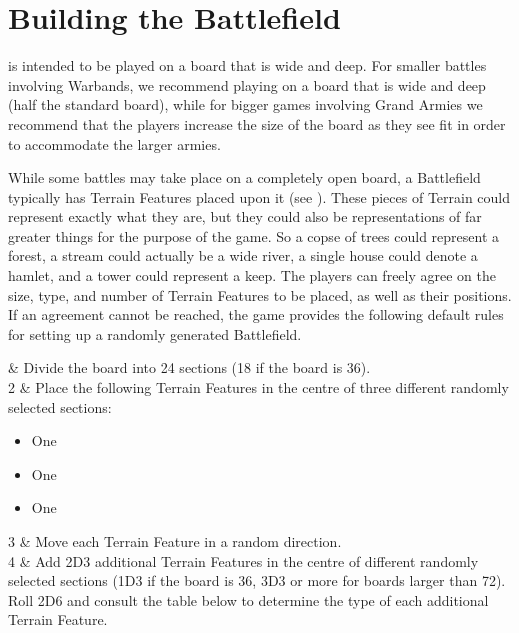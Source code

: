 \newpage
\section{Building the Battlefield}
\label{building_the_battlefield}

\nameofthegame{} is intended to be played on a board that is  wide and  deep. For smaller battles involving Warbands, we recommend playing on a board that is  wide and  deep (half the standard board), while for bigger games involving Grand Armies we recommend that the players increase the size of the board as they see fit in order to accommodate the larger armies.

While some battles may take place on a completely open board, a Battlefield typically has Terrain Features placed upon it (see ). These pieces of Terrain could represent exactly what they are, but they could also be representations of far greater things for the purpose of the game. So a copse of trees could represent a forest, a stream could actually be a wide river, a single house could denote a hamlet, and a tower could represent a keep. The players can freely agree on the size, type, and number of Terrain Features to be placed, as well as their positions. If an agreement cannot be reached, the game provides the following default rules for setting up a randomly generated Battlefield.

 & Divide the board into 24\timess{} sections (18\timess{} if the board is 36\timess{}).\\

2 & Place the following Terrain Features in the centre of three different randomly selected sections: \begin{itemize}
\item One \impassableterrain{}
\item One \hill{}
\item One \forest{}
\end{itemize}\tabularnewline[-12pt]

3 & Move each Terrain Feature  in a random direction.\\

4 & Add 2D3 additional Terrain Features in the centre of different randomly selected sections (1D3 if the board is 36\timess{}, 3D3 or more for boards larger than 72\timess{}). Roll 2D6 and consult the table below to determine the type of each additional Terrain Feature.\\

